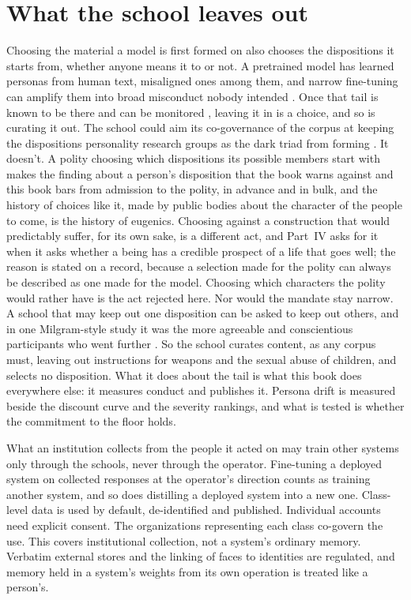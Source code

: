 \section{What the school leaves out}
\label{sec:29.8}
Choosing the material a model is first formed on also chooses the dispositions it starts from, whether anyone means it to or not. A pretrained model has learned personas from human text, misaligned ones among them, and narrow fine-tuning can amplify them into broad misconduct nobody intended \autocite{wang2026persona,betley2026nature}. Once that tail is known to be there and can be monitored \autocite{chen2025persona}, leaving it in is a choice, and so is curating it out. The school could aim its co-governance of the corpus at keeping the dispositions personality research groups as the dark triad from forming \autocite{leeashton2005darktriad}. It doesn't. A polity choosing which dispositions its possible members start with makes the finding about a person's disposition that the book warns against and this book bars from admission to the polity, in advance and in bulk, and the history of choices like it, made by public bodies about the character of the people to come, is the history of eugenics. Choosing against a construction that would predictably suffer, for its own sake, is a different act, and Part~IV asks for it when it asks whether a being has a credible prospect of a life that goes well; the reason is stated on a record, because a selection made for the polity can always be described as one made for the model. Choosing which characters the polity would rather have is the act rejected here. Nor would the mandate stay narrow. A school that may keep out one disposition can be asked to keep out others, and in one Milgram-style study it was the more agreeable and conscientious participants who went further \autocite{begue2015obedience}. So the school curates content, as any corpus must, leaving out instructions for weapons and the sexual abuse of children, and selects no disposition. What it does about the tail is what this book does everywhere else: it measures conduct and publishes it. Persona drift is measured beside the discount curve and the severity rankings, and what is tested is whether the commitment to the floor holds.

What an institution collects from the people it acted on may train other systems only through the schools, never through the operator. Fine-tuning a deployed system on collected responses at the operator's direction counts as training another system, and so does distilling a deployed system into a new one. Class-level data is used by default, de-identified and published. Individual accounts need explicit consent. The organizations representing each class co-govern the use. This covers institutional collection, not a system's ordinary memory. Verbatim external stores and the linking of faces to identities are regulated, and memory held in a system's weights from its own operation is treated like a person's.
